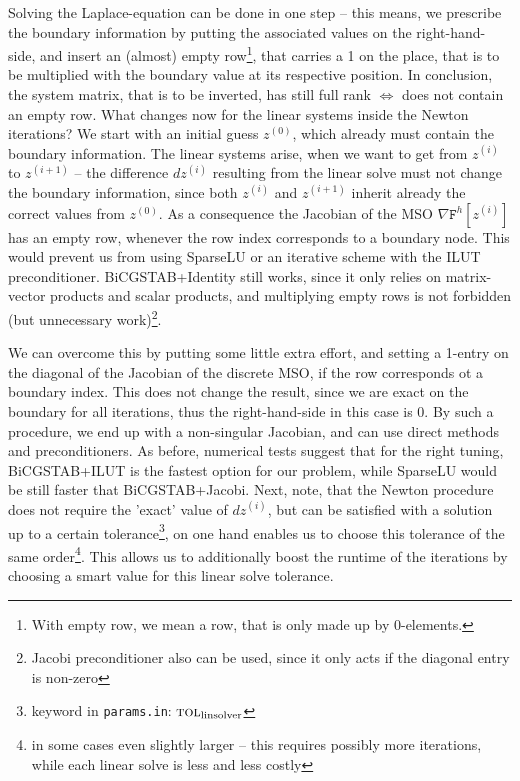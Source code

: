 \documentclass[11pt]{scrartcl}
\newcommand{\mSurfDisc}[1]{\ensuremath{\mathtt{F}^h\left[#1\right]}}
\begin{document}
Solving the Laplace-equation can be done in one step -- this means, we prescribe the boundary information by putting the associated values on the right-hand-side, and insert an (almost) empty row\footnote{With empty row, we mean a row, that is only made up by 0-elements.}, that carries a 1 on the place, that is to be multiplied with the boundary value at its respective position. In conclusion, the system matrix, that is to be inverted, has still full rank $\Leftrightarrow$ does not contain an empty row. What changes now for the linear systems inside the Newton iterations? We start with an initial guess $z^{(0)}$, which already must contain the boundary information. The linear systems arise, when we want to get from $z^{(i)}$ to $z^{(i+1)}$ -- the difference $dz^{(i)}$ resulting from the linear solve must not change the boundary information, since both  $z^{(i)}$ and $z^{(i+1)}$ inherit already the correct values from $z^{(0)}$. As a consequence the Jacobian of the MSO $\nabla\mSurfDisc{z^{(i)}}$ has an empty row, whenever the row index corresponds to a boundary node. This would prevent us from using SparseLU or an iterative scheme with the ILUT preconditioner. BiCGSTAB+Identity still works, since it only relies on matrix-vector products and scalar products, and multiplying empty rows is not forbidden (but unnecessary work)\footnote{Jacobi preconditioner also can be used, since it only acts if the diagonal entry is non-zero}.

We can overcome this by putting some little extra effort, and setting a 1-entry on the diagonal of the Jacobian of the discrete MSO, if the row corresponds ot a boundary index. This does not change the result, since we are exact on the boundary for all iterations, thus the right-hand-side in this case is 0. By such a procedure, we end up with a non-singular Jacobian, and can use direct methods and preconditioners. As before, numerical tests suggest that for the right tuning, BiCGSTAB+ILUT is the fastest option for our problem, while SparseLU would be still faster that BiCGSTAB+Jacobi. 
Next, note, that the Newton procedure does not require the 'exact' value of $dz^{(i)}$, but can be satisfied with a solution up to a certain tolerance\footnote{keyword in \texttt{params.in}: $\textsc{tol}_\text{linsolver}$}, on one hand enables us to choose this tolerance of the same order\footnote{in some cases even slightly larger -- this requires possibly more iterations, while each linear solve is less and less costly}. This allows us to additionally boost the runtime of the iterations by choosing a smart value for this linear solve tolerance. 
\end{document}
